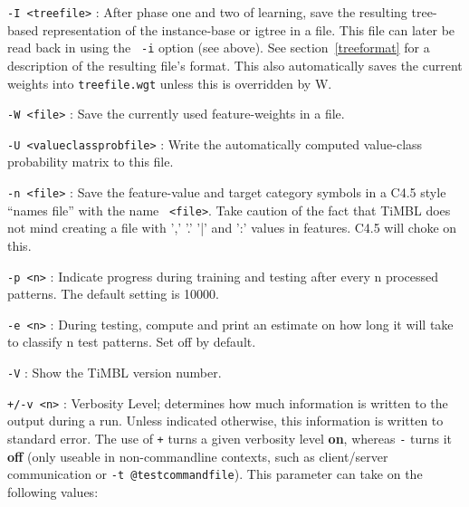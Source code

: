\documentclass{report}
\begin{document}
\begin{description}

\item {\tt -I <treefile>} : After phase one and two of learning, save
the resulting tree-based representation of the instance-base or {\sc
igtree} in a file. This file can later be read back in using the {\tt
-i} option (see above). See section~\ref{treeformat} for a description
of the resulting file's format. This also automatically saves the
current weights into {\tt treefile.wgt} unless this is overridden by
{\-W}.

\item {\tt -W <file>} : Save the currently used feature-weights in a
file.

\item {\tt -U <valueclassprobfile>} : Write the automatically computed
value-class probability matrix to this file.

\item {\tt -n <file>} : Save the feature-value and target category
symbols in a C4.5 style ``names file'' with the name {\tt
<file>}. Take caution of the fact that TiMBL does not mind creating a
file with ',' '.' '|' and ':' values in features. C4.5 will choke on this.

\item {\tt -p <n>} : Indicate progress during training and testing
after every n processed patterns. The default setting is 10000.

\item {\tt -e <n>} : During testing, compute and print an estimate on
how long it will take to classify n test patterns. Set off by
default.

\item {\tt -V} : Show the TiMBL version number.

\item {\tt +/-v <n>} : Verbosity Level; determines how much
information is written to the output during a run. Unless indicated
otherwise, this information is written to standard error. The use of
{\tt +} turns a given verbosity level {\bf on}, whereas {\tt -} turns
it {\bf off} (only useable in non-commandline contexts, such as
client/server communication or {\tt -t @testcommandfile}). This
parameter can take on the following values:


\end{description}
\end{document}

